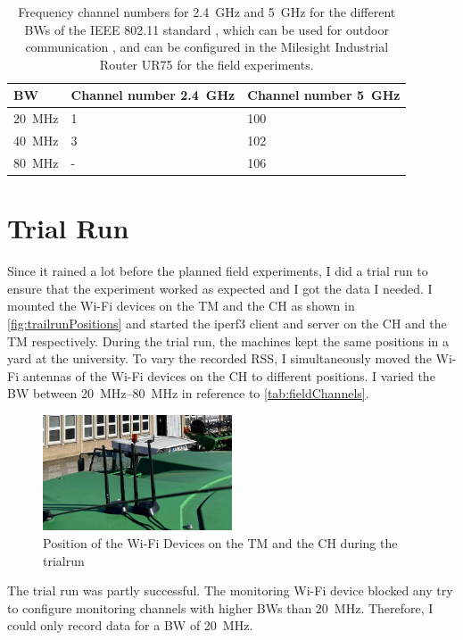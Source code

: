 \begin{table}[H]
	\centering
	\begin{tabular}{>{\centering}p{2cm}p{4cm}p{4cm}}
		\toprule
		\ac{BW} & Channel number \SI{2.4}{\giga\hertz} & Channel number \SI{5}{\giga\hertz}\\
		\midrule
		\SI{20}{\mega\hertz} & \num{1}&
		\num{100} \\
		\SI{40}{\mega\hertz} &
		\num{3}
		& \num{102} \\
		\SI{80}{\mega\hertz} &
		- & \num{106} \\
		\bottomrule
	\end{tabular}
	\caption{Frequency channel numbers for \SI{2.4}{\giga\hertz} and \SI{5}{\giga\hertz} for the different \acf{BW}s of the IEEE 802.11 standard \cite{ieee_standard_2021ax}, which can be used for
	outdoor communication \cite{freq_plan_24G}, \cite{freq_plan_5G} and can be configured in the Milesight Industrial Router UR75 for
	the field experiments.}
	\label{tab:fieldChannels}
\end{table}

\section{Trial Run}

Since it rained a lot before the planned field experiments, I did a trial run to ensure that the experiment worked as expected and I got the data I needed.
I mounted the Wi-Fi devices on the \ac{TM} and the \ac{CH} as shown in \autoref{fig:trailrunPositions} and
started the iperf3 client and server on the \ac{CH} and the \ac{TM} respectively.
During the trial run, the machines kept the same positions in a yard at the university.
To vary the recorded \ac{RSS}, I simultaneously moved the Wi-Fi antennas of the Wi-Fi devices on the \ac{CH} to
different positions.
I varied the \ac{BW} between \SIrange{20}{80}{\mega\hertz} in reference to \autoref{tab:fieldChannels}.
\begin{figure}[]%
   \centering
   \includegraphics[width=0.5\textwidth]{figures/trainRun}
   \caption{Position of the Wi-Fi Devices on the \ac{TM} and the \ac{CH} during the trialrun}
   \label{fig:trailrunPositions}%
\end{figure}
The trial run was partly successful.
The monitoring Wi-Fi device blocked any try to configure monitoring channels with higher \ac{BW}s than \SI{20}{\mega\hertz}.
Therefore, I could only record data for a \ac{BW} of \SI{20}{\mega\hertz}.

